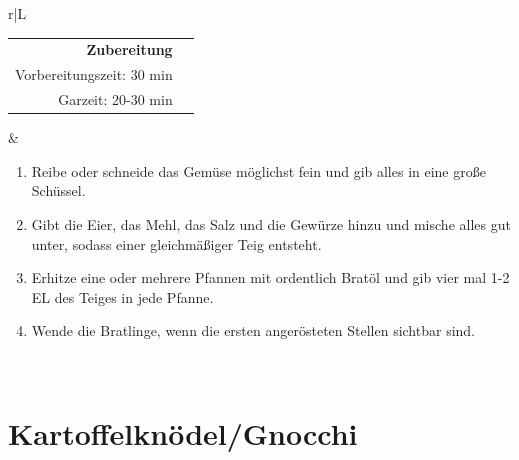 \documentclass[a4paper, 12pt]{scrbook} 								%
\numberwithin{equation}{section} 									%
\begin{document}
	\begin{tabularx}{\textwidth}{r|L}
		\begin{tabular}[t]{rr}
			\textbf{Zubereitung}	\\
			Vorbereitungszeit: 30 min	\\
			Garzeit: 20-30 min		\\
		\end{tabular}			&	\begin{enumerate}[]
										\item Reibe oder schneide das Gemüse möglichst fein und gib alles in eine große Schüssel.
										\item Gibt die Eier, das Mehl, das Salz und die Gewürze hinzu und mische alles gut unter, sodass einer gleichmäßiger Teig entsteht.
										\item Erhitze eine oder mehrere Pfannen mit ordentlich Bratöl und gib vier mal 1-2 EL des Teiges in jede Pfanne.
										\item Wende die Bratlinge, wenn die ersten angerösteten Stellen sichtbar sind.
									\end{enumerate}	\\
	\end{tabularx}
	\newpage


	\section{Kartoffelknödel/Gnocchi}	\label{kartoffelknoedel}
\end{document}
